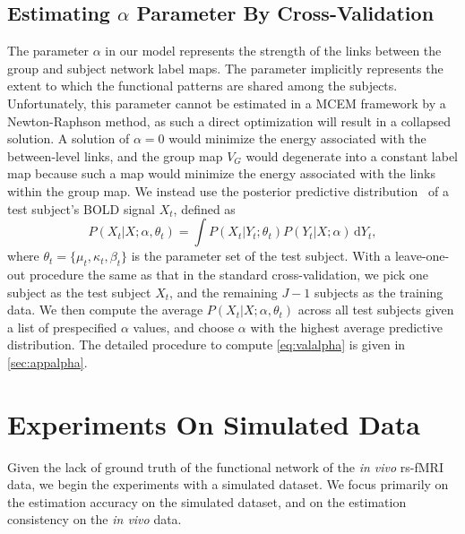 \documentclass[review,authoryear]{elsarticle}
\begin{document}
\subsection{Estimating $\alpha$  Parameter By Cross-Validation}
\label{sec:alpha}
The parameter $\alpha$ in our model represents the strength of the links between
the group and subject network label maps. The parameter implicitly represents
the extent to which the functional patterns are shared among the
subjects. Unfortunately, this parameter cannot be estimated in a MCEM framework
by a Newton-Raphson method, as such a direct optimization will result in a
collapsed solution. A solution of $\alpha = 0$ would minimize the energy
associated with the between-level links, and the group map $V_G$ would
degenerate into a constant label map because such a map would minimize the
energy associated with the links within the group map. We instead use the
posterior predictive distribution~\citep{gelman2003bayesian} of a test subject's
BOLD signal $X_t$, defined as
\begin{equation}
P(X_t | X;\alpha, \theta_t) = \int \!P(X_t | Y_t; \theta_t) P(Y_t| X;\alpha)\, \textrm{d} Y_t,
\label{eq:valalpha}
\end{equation}
where $\theta_t = \{\mu_t, \kappa_t, \beta_t\}$ is the parameter set of the test
subject. With a leave-one-out procedure the same as that in the standard
cross-validation, we pick one subject as the test subject $X_t$, and the
remaining $J-1$ subjects as the training data. We then compute the average
$P(X_t | X;\alpha, \theta_t)$ across all test subjects given a list of prespecified
$\alpha$ values, and choose $\alpha$ with the highest average predictive
distribution. The detailed procedure to compute \eqref{eq:valalpha} is given in
\ref{sec:appalpha}.

\section{Experiments On Simulated Data}
\label{sec:synexperiments}
Given the lack of ground truth of the functional network of the \emph{in vivo}
rs-fMRI data, we begin the experiments with a simulated dataset. We focus
primarily on the estimation accuracy on the simulated dataset, and on the
estimation consistency on the \emph{in vivo} data.
\end{document}
